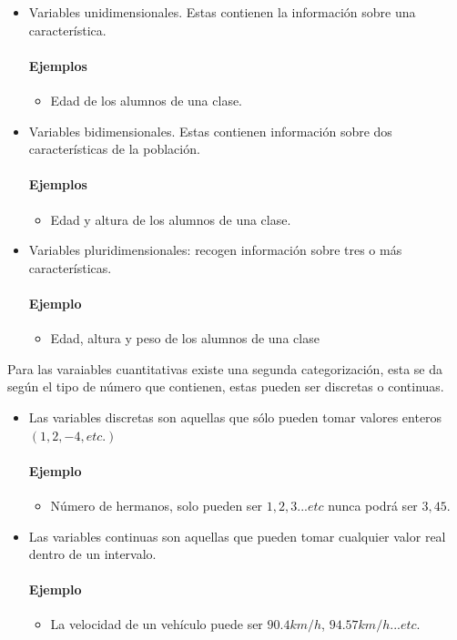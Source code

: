 \documentclass[12pt,hidelinks]{article}
\begin{document}
	\begin{itemize}
		\item Variables unidimensionales. Estas contienen la información sobre una característica.
		\paragraph{Ejemplos}
		\begin{itemize}
			\item Edad de los alumnos de una clase.
		\end{itemize}
		\item Variables bidimensionales. Estas contienen información sobre dos características de la población.
		\paragraph{Ejemplos}
		\begin{itemize}
			\item Edad y altura de los alumnos de una clase.
		\end{itemize}
		\item Variables pluridimensionales: recogen información sobre tres o más características.
		\paragraph{Ejemplo}
		\begin{itemize}
			\item Edad, altura y peso de los alumnos de una clase
		\end{itemize}
	\end{itemize}
	Para las varaiables cuantitativas existe una segunda categorización, esta se da según el tipo de número que contienen, estas pueden ser discretas o continuas.
	\begin{itemize}
		\item Las variables discretas son aquellas que sólo pueden tomar valores enteros $(1, 2, -4, etc.)$
		\paragraph{Ejemplo}
		\begin{itemize}
			\item Número de hermanos, solo pueden ser $1, 2, 3 ... etc$ nunca podrá ser $3,45$.
		\end{itemize}
		\item Las variables continuas son aquellas que  pueden tomar cualquier valor real dentro de un intervalo.
		\paragraph{Ejemplo}
		\begin{itemize}
			\item La velocidad de un vehículo puede ser $90.4 km/h$, $94.57 km/h...etc$.
		\end{itemize}
	\end{itemize}
\end{document}
